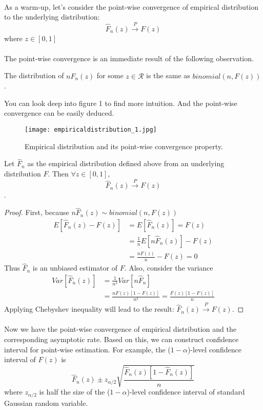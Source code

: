 \documentclass[final_project_1.tex]{subfiles}
\begin{document}
\paragraph{}
As a warm-up, let's consider the point-wise convergence of empirical distribution to the underlying distribution: 
$$\hat{F}_n(z)\xrightarrow{P}F(z)$$ 
where $z\in [0,1]$

\paragraph{}
The point-wise convergence is an immediate result of the following observation.
\begin{observation}
The distribution of $n\hat{F}_n(z)$ for some $z\in\mathcal{R}$ is the same as $binomial(n, F(z))$. \end{observation}
You can look deep into figure 1 to find more intuition. And the point-wise convergence can be easily deduced.
\begin{figure}[h]
\texttt{[image: empiricaldistribution\_1.jpg]}
\caption{Empirical distribution and its point-wise convergence property.}
\end{figure}

\begin{theorem}
Let $\hat{F}_n$ as the empirical distribution defined above from an underlying distribution $F$. Then $\forall z\in [0,1]$, 
$$\hat{F}_n(z)\xrightarrow{P}F(z)$$.
\end{theorem}

\begin{proof}
First, because $n\hat{F}_n(z)\sim binomial(n,F(z))$
\begin{align*}
E[\hat{F}_n(z)-F(z)] &= E[\hat{F}_n(z)] = F(z)\\
&=\frac{1}{n}E[n\hat{F}_n(z)]-F(z)\\
&=\frac{nF(z)}{n}-F(z) = 0
\end{align*}
Thus $\hat{F}_n$ is an unbiased estimator of $F$. Also, consider the variance
\begin{align*}
Var[\hat{F}_n(z)] &= \frac{1}{n^2}Var[n\hat{F}_n]\\
&=\frac{nF(z)[1-F(z)]}{n^2} = \frac{F(z)[1-F(z)]}{n}
\end{align*}
Applying Chebyshev inequality will lead to the result: $\hat{F}_n(z)\xrightarrow{P}F(z)$.
\end{proof}

\paragraph{}
Now we have the point-wise convergence of empirical distribution and the corresponding asymptotic rate. Based on this, we can construct confidence interval for point-wise estimation. For example, the ($1-\alpha$)-level confidence interval of $F(z)$ is
$$\hat{F}_n(z) \pm z_{\alpha/2}\sqrt{\frac{\hat{F}_n(z)[1-\hat{F}_n(z)]}{n}}$$
where $z_{\alpha/2}$ is half the size of the ($1-\alpha$)-level confidence interval of standard Gaussian random variable.
\end{document}
